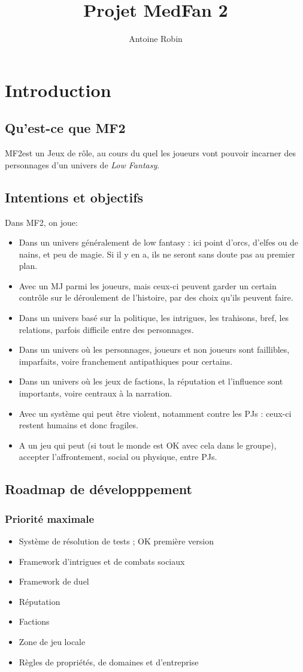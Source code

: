 \documentclass[10pt,a4paper]{book}
\author{ Antoine Robin}
\title{Projet MedFan 2}
\newcommand{\titre}{MF2}
\begin{document}
\maketitle
\tableofcontents
\chapter*{Introduction}
\section*{Qu'est-ce que \titre}
\titre est un Jeux de rôle, au cours du quel les joueurs vont pouvoir incarner des personnages d'un univers de \emph{Low Fantasy}. 
\section*{Intentions et objectifs}
Dans \titre, on joue:
\begin{itemize}
\item Dans un univers généralement de low fantasy : ici point d'orcs, d'elfes ou de nains, et peu de magie. Si il y en a, ils ne seront sans doute pas au premier plan.
\item Avec un MJ parmi les joueurs, mais ceux-ci peuvent garder un certain contrôle sur le déroulement de l'histoire, par des choix qu'ils peuvent faire.
\item Dans un univers basé sur la politique, les intrigues, les trahisons, bref, les relations, parfois difficile entre des personnages.
\item Dans un univers où les personnages, joueurs et non joueurs sont faillibles, imparfaits, voire franchement antipathiques pour certains.
\item Dans un univers où les jeux de factions, la réputation et l'influence sont importants, voire centraux à la narration.
\item Avec un système qui peut être violent, notamment contre les PJs : ceux-ci restent humains et donc fragiles.
\item A un jeu qui peut (si tout le monde est OK avec cela dans le groupe), accepter l'affrontement, social ou physique, entre PJs.
\end{itemize}
\section*{Roadmap de développpement}
\subsection*{Priorité maximale}
\begin{itemize}
\item Système de résolution de tests ; OK première version
\item Framework d'intrigues et de combats sociaux
\item Framework de duel
\item Réputation
\item Factions
\item Zone de jeu locale
\item Règles de propriétés, de domaines et d'entreprise
\end{itemize}
\end{document}

